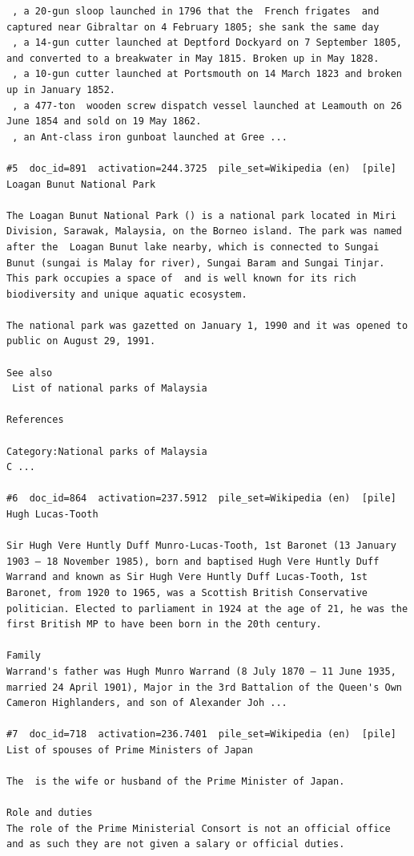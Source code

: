 \begin{verbatim}
 , a 20-gun sloop launched in 1796 that the  French frigates  and  captured near Gibraltar on 4 February 1805; she sank the same day
 , a 14-gun cutter launched at Deptford Dockyard on 7 September 1805, and converted to a breakwater in May 1815. Broken up in May 1828.
 , a 10-gun cutter launched at Portsmouth on 14 March 1823 and broken up in January 1852.
 , a 477-ton  wooden screw dispatch vessel launched at Leamouth on 26 June 1854 and sold on 19 May 1862.
 , an Ant-class iron gunboat launched at Gree ...

#5  doc_id=891  activation=244.3725  pile_set=Wikipedia (en)  [pile]
Loagan Bunut National Park

The Loagan Bunut National Park () is a national park located in Miri Division, Sarawak, Malaysia, on the Borneo island. The park was named after the  Loagan Bunut lake nearby, which is connected to Sungai Bunut (sungai is Malay for river), Sungai Baram and Sungai Tinjar. This park occupies a space of  and is well known for its rich biodiversity and unique aquatic ecosystem.

The national park was gazetted on January 1, 1990 and it was opened to public on August 29, 1991.

See also
 List of national parks of Malaysia

References

Category:National parks of Malaysia
C ...

#6  doc_id=864  activation=237.5912  pile_set=Wikipedia (en)  [pile]
Hugh Lucas-Tooth

Sir Hugh Vere Huntly Duff Munro-Lucas-Tooth, 1st Baronet (13 January 1903 – 18 November 1985), born and baptised Hugh Vere Huntly Duff Warrand and known as Sir Hugh Vere Huntly Duff Lucas-Tooth, 1st Baronet, from 1920 to 1965, was a Scottish British Conservative politician. Elected to parliament in 1924 at the age of 21, he was the first British MP to have been born in the 20th century.

Family
Warrand's father was Hugh Munro Warrand (8 July 1870 – 11 June 1935, married 24 April 1901), Major in the 3rd Battalion of the Queen's Own Cameron Highlanders, and son of Alexander Joh ...

#7  doc_id=718  activation=236.7401  pile_set=Wikipedia (en)  [pile]
List of spouses of Prime Ministers of Japan

The  is the wife or husband of the Prime Minister of Japan.

Role and duties
The role of the Prime Ministerial Consort is not an official office and as such they are not given a salary or official duties.


\end{verbatim}
